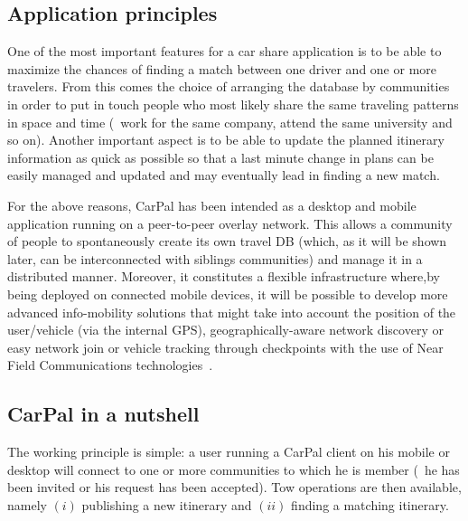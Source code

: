 \subsection{Application principles}
%
One of the most important features for a car share application is to
be able to maximize the chances of finding a match between one driver
and one or more travelers. From this comes the choice of arranging
the database by communities in order to put in touch people who most
likely share the same traveling patterns in space and time (\eg\ work
for the same company, attend the same university and so on). Another
important aspect is to be able to update the planned itinerary
information as quick as possible so that a last minute change in plans
can be easily managed and updated and may eventually lead in finding a
new match.
 
For the above reasons, CarPal has been intended as a desktop and
mobile application running on a peer-to-peer overlay network. This
allows a community of people to spontaneously create its own travel DB
(which, as it will be shown later, can be interconnected with siblings
communities) and manage it in a distributed manner.  Moreover, it
constitutes a flexible infrastructure where,by being deployed on
connected mobile devices, it will be possible to develop more advanced
info-mobility solutions that might take into account the position of
the user/vehicle (via the internal GPS), geographically-aware network
discovery or easy network join or vehicle tracking through checkpoints
with the use of Near Field Communications technologies~\cite{NFC}.

\subsection{CarPal in a nutshell}
%
The working principle is simple: a user running a CarPal client on his
mobile or desktop will connect to one or more communities to which he
is member (\ie\ he has been invited or his request has been accepted).
Tow operations are then available, namely $(i)$ publishing a new
itinerary and $(ii)$ finding a matching itinerary.

